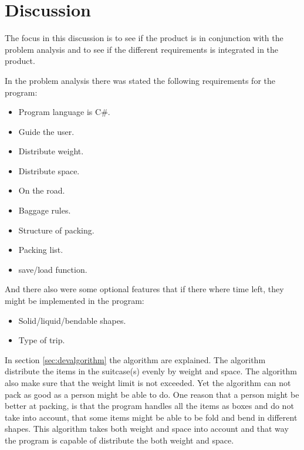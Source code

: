 \section{Discussion}
The focus in this discussion is to see if the product is in conjunction with the problem analysis and to see if the different requirements is integrated in the product.

In the problem analysis there was stated the following requirements for the program:

\begin{itemize}
\item Program language is C\#.
\item Guide the user.
\item Distribute weight.
\item Distribute space.
\item On the road.
\item Baggage rules.
\item Structure of packing.
\item Packing list.
\item save/load function.
\end{itemize}

And there also were some optional features that if there where time left, they might be implemented in the program:
\begin{itemize}
\item Solid/liquid/bendable shapes.
\item Type of trip.
\end{itemize}

In section \ref{sec:devalgorithm} the algorithm are explained. The algorithm distribute the items in the suitcase(s) evenly by weight and space. The algorithm also make sure that the weight limit is not exceeded. Yet the algorithm can not pack as good as a person might be able to do. One reason that a person might be better at packing, is that the program handles all the items as boxes and do not take into account, that some items might be able to be fold and bend in different shapes. This algorithm takes both weight and space into account and that way the program is capable of distribute the both weight and space.

